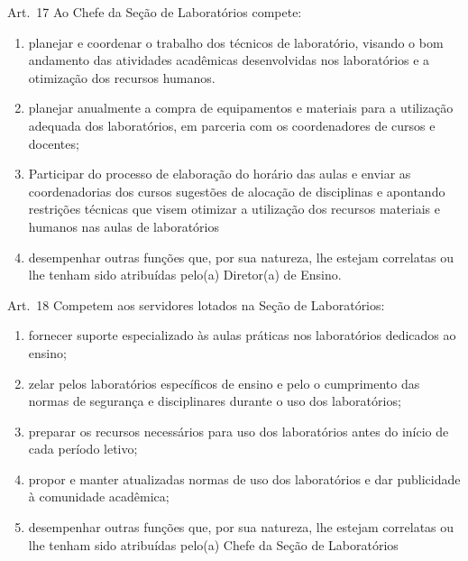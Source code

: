 \documentclass[a4paper,12pt]{report}
\begin{document}
Art.~17 Ao Chefe da Seção de Laboratórios compete:

\begin{enumerate}
\renewcommand{\labelenumi}{\Roman{enumi}}

\item planejar e coordenar o trabalho dos técnicos de laboratório, visando o bom andamento 
      das atividades acadêmicas desenvolvidas nos laboratórios e a otimização dos recursos humanos.

\item planejar anualmente a compra de equipamentos e materiais para a utilização adequada 
      dos laboratórios, em parceria com os coordenadores de cursos e docentes;

\item Participar do processo de elaboração do horário das aulas e enviar as coordenadorias 
      dos cursos sugestões de alocação de disciplinas e apontando restrições técnicas que visem otimizar a utilização dos recursos materiais e humanos nas aulas de laboratórios

\item desempenhar outras funções que, por sua natureza, lhe estejam correlatas ou lhe 
      tenham sido atribuídas pelo(a) Diretor(a) de Ensino.
\end{enumerate}


Art.~18 Competem aos servidores lotados na Seção de Laboratórios:

\begin{enumerate}
\renewcommand{\labelenumi}{\Roman{enumi}}

\item fornecer suporte especializado às aulas práticas nos laboratórios dedicados ao 
      ensino;

\item zelar pelos laboratórios específicos de ensino e pelo o cumprimento das normas 
      de segurança e disciplinares durante o uso dos laboratórios;

\item preparar os recursos necessários para uso dos laboratórios antes do início de cada 
      período letivo; 

\item propor e manter atualizadas normas de uso dos laboratórios e dar publicidade à 
      comunidade acadêmica;

\item desempenhar outras funções que, por sua natureza, lhe estejam correlatas ou lhe 
      tenham sido atribuídas pelo(a) Chefe da Seção de Laboratórios
\end{enumerate}
\end{document}
